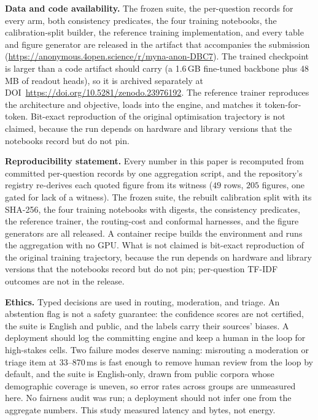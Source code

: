 \textbf{Data and code availability.}
The frozen suite, the per-question records for every \myna{} arm, both consistency predicates, the
four training notebooks, the calibration-split builder, the reference training implementation, and
every table and figure generator are released in the artifact that accompanies the submission
(\url{https://anonymous.4open.science/r/myna-anon-DBC7}). The
trained checkpoint is larger than a code artifact should carry (a 1.6\,GB fine-tuned backbone plus
48\,MB of readout heads), so it is archived separately at
DOI~\url{https://doi.org/10.5281/zenodo.23976192}. The reference trainer reproduces the architecture and
objective, loads into the engine, and matches it token-for-token.
Bit-exact reproduction of the original optimisation trajectory is not claimed, because the run
depends on hardware and library versions that the notebooks record but do not pin.

\textbf{Reproducibility statement.}
Every number in this paper is recomputed from committed per-question records by one aggregation
script, and the repository's registry re-derives each quoted figure from its witness
($49$ rows, $205$ figures, one gated for lack of a witness). The frozen suite, the rebuilt
calibration split with its SHA-256, the four training notebooks with digests, the consistency
predicates, the reference trainer, the routing-cost and conformal harnesses, and the figure
generators are all released. A container recipe builds the environment and runs the aggregation
with no GPU. What is not claimed is bit-exact reproduction of the original training trajectory,
because the run depends on hardware and library versions that the notebooks record but do not pin;
per-question TF-IDF outcomes are not in the release.

\textbf{Ethics.}
Typed decisions are used in routing, moderation, and triage. An abstention flag is not a safety
guarantee: the confidence scores are not certified, the suite is English and public, and the labels
carry their sources' biases. A deployment should log the committing engine and keep a human in the
loop for high-stakes cells. Two failure modes deserve naming: misrouting a moderation or triage
item at 33--870\,ms is fast enough to remove human review from the loop by default, and the suite is
English-only, drawn from public corpora whose demographic coverage is uneven, so error rates across
groups are unmeasured here. No fairness audit was run; a deployment should not infer one from the
aggregate numbers. This study measured latency and bytes, not energy.

